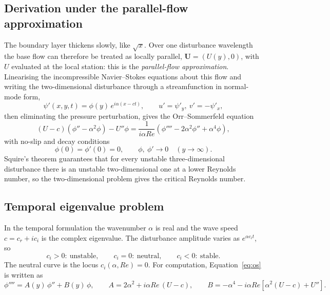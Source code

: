 \documentclass[12pt,a4paper]{article}
\begin{document}
\subsection{Derivation under the parallel-flow approximation}

The boundary layer thickens slowly, like $\sqrt{x}$. Over one disturbance wavelength the base flow can therefore be treated as locally parallel, $\mathbf{U} = (U(y), 0)$, with $U$ evaluated at the local station: this is the \emph{parallel-flow approximation}. Linearising the incompressible Navier--Stokes equations about this flow and writing the two-dimensional disturbance through a streamfunction in normal-mode form,
\begin{equation}
    \psi'(x, y, t) = \phi(y)\, e^{i\alpha(x - ct)}, \qquad u' = \psi'_y,\ v' = -\psi'_x,
\end{equation}
then eliminating the pressure perturbation, gives the Orr--Sommerfeld equation~\cite{orr1907, sommerfeld1908, drazin2004}
\begin{equation}
    (U - c)(\phi'' - \alpha^2\phi) - U''\phi = \frac{1}{i\alpha Re}\left(\phi'''' - 2\alpha^2\phi'' + \alpha^4\phi\right),
    \label{eq:os}
\end{equation}
with no-slip and decay conditions
\begin{equation}
    \phi(0) = \phi'(0) = 0, \qquad \phi,\ \phi' \to 0 \quad (y \to \infty).
    \label{eq:osbc}
\end{equation}
Squire's theorem guarantees that for every unstable three-dimensional disturbance there is an unstable two-dimensional one at a lower Reynolds number, so the two-dimensional problem gives the critical Reynolds number.

\subsection{Temporal eigenvalue problem}

In the temporal formulation the wavenumber $\alpha$ is real and the wave speed $c = c_r + i c_i$ is the complex eigenvalue. The disturbance amplitude varies as $e^{\alpha c_i t}$, so
\begin{equation}
    c_i > 0:\ \text{unstable}, \qquad c_i = 0:\ \text{neutral}, \qquad c_i < 0:\ \text{stable}.
\end{equation}
The neutral curve is the locus $c_i(\alpha, Re) = 0$. For computation, Equation~\eqref{eq:os} is written as
\begin{equation}
    \phi'''' = A(y)\,\phi'' + B(y)\,\phi, \qquad
    A = 2\alpha^2 + i\alpha Re\,(U - c), \qquad B = -\alpha^4 - i\alpha Re\left[\alpha^2(U - c) + U''\right].
    \label{eq:osAB}
\end{equation}
\end{document}

